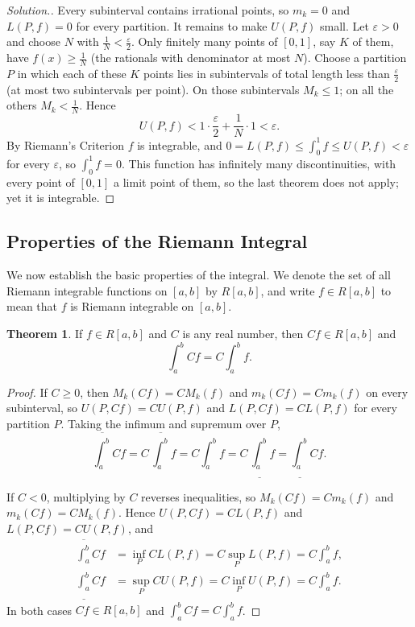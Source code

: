 \documentclass[11pt,a4paper]{article}
\numberwithin{equation}{section}
\theoremstyle{definition}
\newtheorem{thm}{Theorem}[subsection]
\newenvironment{solution}
  {\renewcommand{\qedsymbol}{}\begin{proof}[\textit{Solution}.]}
  {\end{proof}}
\begin{document}
\begin{solution}
Every subinterval contains irrational points, so $m_k = 0$ and $L(P,f) = 0$ for every partition. It remains to make $U(P,f)$ small. Let $\varepsilon>0$ and choose $N$ with $\frac{1}{N}<\frac{\varepsilon}{2}$. Only finitely many points of $[0,1]$, say $K$ of them, have $f(x)\geq\frac{1}{N}$ (the rationals with denominator at most $N$). Choose a partition $P$ in which each of these $K$ points lies in subintervals of total length less than $\frac{\varepsilon}{2}$ (at most two subintervals per point). On those subintervals $M_k\leq 1$; on all the others $M_k<\frac{1}{N}$. Hence
$$U(P,f) < 1\cdot\frac{\varepsilon}{2} + \frac{1}{N}\cdot 1<\varepsilon .$$
By Riemann's Criterion $f$ is integrable, and $0 = L(P,f)\leq\int_0^1f\leq U(P,f)<\varepsilon$ for every $\varepsilon$, so $\int_0^1 f = 0$. This function has infinitely many discontinuities, with every point of $[0,1]$ a limit point of them, so the last theorem does not apply; yet it is integrable.
\end{solution}


\subsection{Properties of the Riemann Integral}

We now establish the basic properties of the integral. We denote the set of all Riemann integrable functions on $[a,b]$ by $R[a,b]$, and write $f\in R[a,b]$ to mean that $f$ is Riemann integrable on $[a,b]$.


\begin{thm}\label{thm:cf}
If $f\in R[a,b]$ and $C$ is any real number, then $Cf\in R[a,b]$ and
$$\int^b_aCf = C\int^b_af.$$
\end{thm}

\begin{proof}
If $C\geq 0$, then $M_k(Cf) = CM_k(f)$ and $m_k(Cf) = Cm_k(f)$ on every subinterval, so $U(P,Cf) = CU(P,f)$ and $L(P,Cf) = CL(P,f)$ for every partition $P$. Taking the infimum and supremum over $P$,
$$\overline{\int^b_a}Cf = C\,\overline{\int^b_a}f = C\int^b_af = C\,\underline{\int^b_a}f = \underline{\int^b_a}Cf .$$

If $C<0$, multiplying by $C$ reverses inequalities, so $M_k(Cf) = Cm_k(f)$ and $m_k(Cf) = CM_k(f)$. Hence $U(P,Cf) = CL(P,f)$ and $L(P,Cf) = CU(P,f)$, and
\begin{align*}
\overline{\int^b_a}Cf &= \inf_P C L(P,f) = C\sup_P L(P,f) = C\int^b_a f,\\
\underline{\int^b_a}Cf &= \sup_P CU(P,f) = C\inf_P U(P,f) = C\int^b_a f .
\end{align*}
In both cases $Cf\in R[a,b]$ and $\int_a^b Cf = C\int_a^b f$.
\end{proof}
\end{document}
